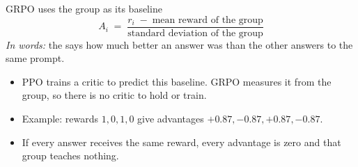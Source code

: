 \documentclass[aspectratio=169,10pt]{beamer}
\begin{document}
\begin{frame}{GRPO uses the group as its baseline}
  \[
    A_i \;=\; \frac{r_i \;-\; \text{mean reward of the group}}
                   {\text{standard deviation of the group}}
  \]
  \emph{In words:} the  says how much better an answer was than
  the other answers to the same prompt.
  \begin{itemize}
    \item PPO trains a critic to predict this baseline. GRPO measures it from
      the group, so there is no critic to hold or train.
    \item Example: rewards $1,0,1,0$ give advantages
      $+0.87,-0.87,+0.87,-0.87$.
    \item If every answer receives the same reward, every advantage is zero
      and that group teaches nothing.
  \end{itemize}
\end{frame}
\end{document}

